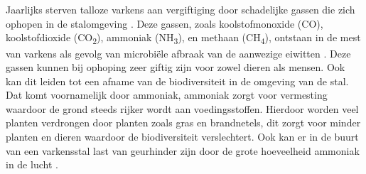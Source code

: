 
\chapter{}%
\label{ch:inleiding}


Jaarlijks sterven talloze varkens aan vergiftiging door schadelijke gassen die zich ophopen in de stalomgeving \autocite{Sercu2023}. Deze gassen, zoals koolstofmonoxide (CO), koolstofdioxide (CO\textsubscript{2}), ammoniak (NH\textsubscript{3}), en methaan (CH\textsubscript{4}), ontstaan in de mest van varkens als gevolg van microbiële afbraak van de aanwezige eiwitten \autocite{Wolf2013}. Deze gassen kunnen bij ophoping zeer giftig zijn voor zowel dieren als mensen. Ook kan dit leiden tot een afname van de biodiversiteit in de omgeving van de stal. Dat komt voornamelijk door ammoniak, ammoniak zorgt voor vermesting waardoor de grond steeds rijker wordt aan voedingsstoffen. Hierdoor worden veel planten verdrongen door planten zoals gras en brandnetels,
dit zorgt voor minder planten en dieren waardoor de biodiversiteit verslechtert. Ook kan er in de buurt van een varkensstal last van geurhinder zijn door de grote hoeveelheid ammoniak in de lucht \autocite{RSS2020}.

